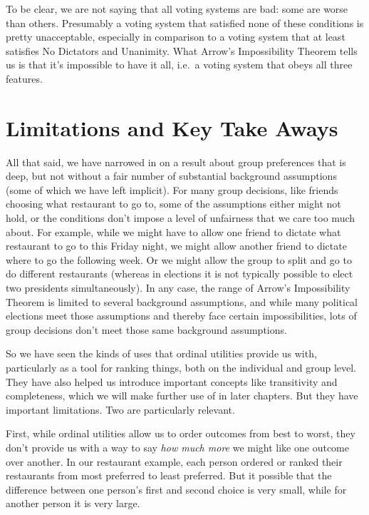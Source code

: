 \documentclass[]{tufte-book}
\begin{document}
To be clear, we are not saying that all voting systems are bad: some are worse than others. Presumably a voting system that satisfied none of these conditions is pretty unacceptable, especially in comparison to a voting system that at least satisfies No Dictators and Unanimity. What Arrow's Impossibility Theorem tells us is that it's impossible to have it all, i.e.~a voting system that obeys all three features.

\hypertarget{limitations-and-key-take-aways}{%
\section{Limitations and Key Take Aways}\label{limitations-and-key-take-aways}}

All that said, we have narrowed in on a result about group preferences that is deep, but not without a fair number of substantial background assumptions (some of which we have left implicit). For many group decisions, like friends choosing what restaurant to go to, some of the assumptions either might not hold, or the conditions don't impose a level of unfairness that we care too much about. For example, while we might have to allow one friend to dictate what restaurant to go to this Friday night, we might allow another friend to dictate where to go the following week. Or we might allow the group to split and go to do different restaurants (whereas in elections it is not typically possible to elect two presidents simultaneously). In any case, the range of Arrow's Impossibility Theorem is limited to several background assumptions, and while many political elections meet those assumptions and thereby face certain impossibilities, lots of group decisions don't meet those same background assumptions.

So we have seen the kinds of uses that ordinal utilities provide us with, particularly as a tool for ranking things, both on the individual and group level. They have also helped us introduce important concepts like transitivity and completeness, which we will make further use of in later chapters. But they have important limitations. Two are particularly relevant.

First, while ordinal utilities allow us to order outcomes from best to worst, they don't provide us with a way to say \emph{how much more} we might like one outcome over another. In our restaurant example, each person ordered or ranked their restaurants from most preferred to least preferred. But it possible that the difference between one person's first and second choice is very small, while for another person it is very large.
\end{document}

